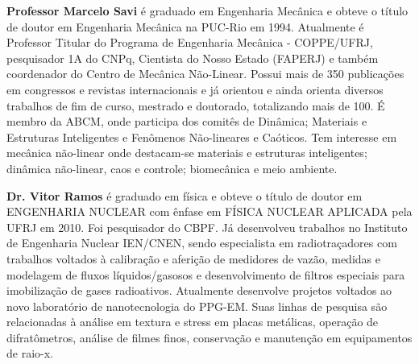 \typeout{ ====================================================================}
\typeout{ ====================================================================}



	



\Large

\noindent \textbf{Professor Marcelo Savi} é graduado em Engenharia
Mecânica e obteve o título de doutor em Engenharia Mecânica na  PUC-Rio
em 1994. Atualmente é Professor Titular do Programa de Engenharia
Mecânica - COPPE/UFRJ, pesquisador 1A do CNPq, Cientista do Nosso Estado
(FAPERJ) e também coordenador do Centro de Mecânica Não-Linear. Possui
mais de 350 publicações em congressos e revistas internacionais e já
orientou e ainda orienta diversos trabalhos de fim de curso, mestrado e
doutorado, totalizando mais de 100. É membro da ABCM, onde participa dos
comitês de Dinâmica; Materiais e Estruturas Inteligentes e Fenômenos
Não-lineares e Caóticos. Tem interesse em mecânica não-linear onde
destacam-se materiais e estruturas inteligentes; dinâmica não-linear,
caos e controle; biomecânica e meio ambiente.

\vspace{1cm}

\noindent \textbf{Dr. Vitor Ramos} é graduado em física e obteve o título de
doutor em ENGENHARIA NUCLEAR com ênfase em FÍSICA NUCLEAR APLICADA pela
UFRJ em 2010. Foi pesquisador do CBPF. Já desenvolveu trabalhos no
Instituto de Engenharia Nuclear IEN/CNEN, sendo especialista em
radiotraçadores com trabalhos voltados à calibração e aferição de
medidores de vazão, medidas e modelagem de fluxos líquidos/gasosos e
desenvolvimento de filtros especiais para imobilização de gases
radioativos. Atualmente desenvolve projetos voltados ao novo laboratório
de nanotecnologia do PPG-EM. Suas linhas de pesquisa são relacionadas à
análise em textura e stress em placas metálicas, operação de
difratômetros, análise de filmes finos, conservação e manutenção em
equipamentos de raio-x.






